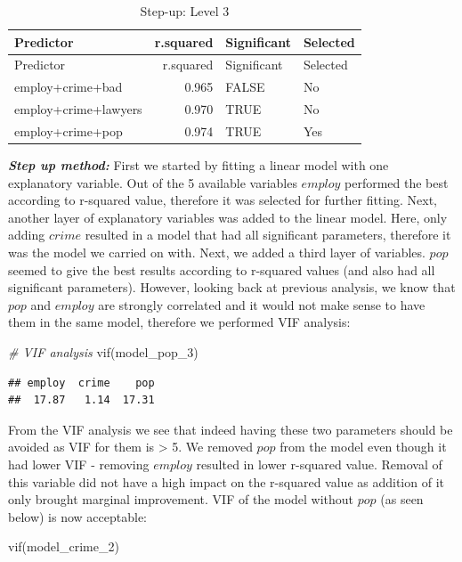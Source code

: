 \documentclass[
  10pt,
]{article}
\newenvironment{Shaded}{\begin{snugshade}}{\end{snugshade}}
\newcommand{\CommentTok}[1]{\textcolor[rgb]{0.56,0.35,0.01}{\textit{#1}}}
\newcommand{\FunctionTok}[1]{\textcolor[rgb]{0.00,0.00,0.00}{#1}}
\newcommand{\NormalTok}[1]{#1}
\begin{document}
\begin{longtable}[]{@{}lrll@{}}
\caption{Step-up: Level 3}\tabularnewline
\toprule
Predictor & r.squared & Significant & Selected\tabularnewline
\midrule
\endfirsthead
\toprule
Predictor & r.squared & Significant & Selected\tabularnewline
\midrule
\endhead
employ+crime+bad & 0.965 & FALSE & No\tabularnewline
employ+crime+lawyers & 0.970 & TRUE & No\tabularnewline
employ+crime+pop & 0.974 & TRUE & Yes\tabularnewline
\bottomrule
\end{longtable}

\textbf{\emph{Step up method:}} First we started by fitting a linear
model with one explanatory variable. Out of the 5 available variables
\(employ\) performed the best according to r-squared value, therefore it
was selected for further fitting. Next, another layer of explanatory
variables was added to the linear model. Here, only adding \(crime\)
resulted in a model that had all significant parameters, therefore it
was the model we carried on with. Next, we added a third layer of
variables. \(pop\) seemed to give the best results according to
r-squared values (and also had all significant parameters). However,
looking back at previous analysis, we know that \(pop\) and \(employ\)
are strongly correlated and it would not make sense to have them in the
same model, therefore we performed VIF analysis:

\begin{Shaded}
\begin{Highlighting}[]
\CommentTok{\# VIF analysis}
\FunctionTok{vif}\NormalTok{(model\_pop\_3)}
\end{Highlighting}
\end{Shaded}

\begin{verbatim}
## employ  crime    pop 
##  17.87   1.14  17.31
\end{verbatim}

From the VIF analysis we see that indeed having these two parameters
should be avoided as VIF for them is \textgreater{} 5. We removed
\(pop\) from the model even though it had lower VIF - removing
\(employ\) resulted in lower r-squared value. Removal of this variable
did not have a high impact on the r-squared value as addition of it only
brought marginal improvement. VIF of the model without \(pop\) (as seen
below) is now acceptable:

\begin{Shaded}
\begin{Highlighting}[]
\FunctionTok{vif}\NormalTok{(model\_crime\_2)}
\end{Highlighting}
\end{Shaded}
\end{document}
